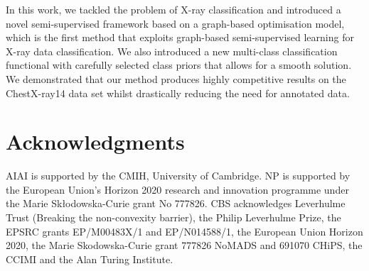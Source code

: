\documentclass[runningheads]{llncs}
\begin{document}
In this work, we tackled the problem of X-ray classification and introduced a novel semi-supervised framework based on a graph-based optimisation model, which is the first method that exploits graph-based semi-supervised learning for X-ray data classification. We also introduced a new multi-class classification functional with carefully selected class priors that allows for a smooth solution. We demonstrated that our method produces highly competitive results on the ChestX-ray14 data set whilst drastically reducing the need for annotated data.

\section*{Acknowledgments}
AIAI is supported by the CMIH, University of Cambridge. NP is supported by the European Union’s Horizon 2020 research and innovation programme under the Marie Skłodowska-Curie grant No 777826.
CBS acknowledges  Leverhulme Trust (Breaking the non-convexity barrier), the Philip Leverhulme Prize, the EPSRC grants  EP/M00483X/1 and EP/N014588/1, the European Union Horizon 2020, the Marie Skodowska-Curie grant 777826 NoMADS and 691070 CHiPS, the CCIMI and the Alan Turing Institute.



\end{document}
